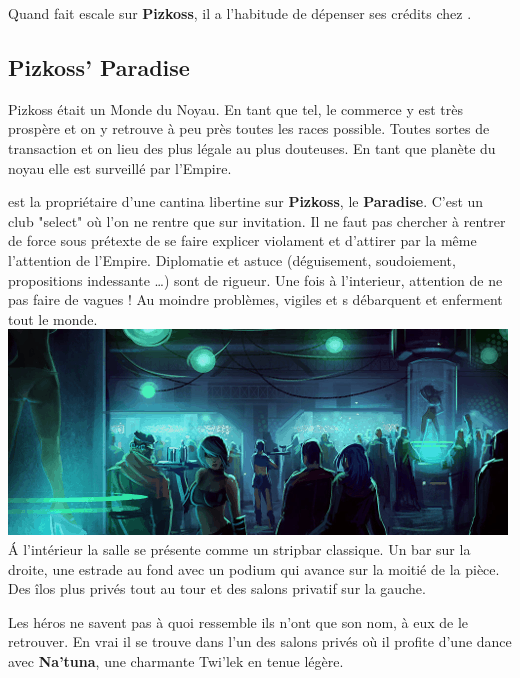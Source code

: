 Quand  fait escale sur \textbf{Pizkoss}, il a l’habitude de dépenser ses crédits chez .

\newpage
\subsection{Pizkoss’ Paradise}
Pizkoss était un Monde du Noyau. En tant que tel, le commerce y est très prospère et on y retrouve à peu près toutes les races possible. Toutes sortes de transaction et on lieu des plus légale au plus douteuses. En tant que planète du noyau elle est surveillé par l’Empire.

 est la propriétaire d’une cantina libertine sur \textbf{Pizkoss}, le \textbf{Paradise}. C’est un club "select" où l’on ne rentre que sur invitation. Il ne faut pas chercher à rentrer de force sous prétexte de se faire explicer violament et d’attirer par la même l’attention de l’Empire. Diplomatie et astuce (déguisement, soudoiement, propositions indessante \ldots) sont de rigueur. Une fois à l’interieur, attention de ne pas faire de vagues ! Au moindre problèmes, vigiles et s débarquent et enferment tout le monde.\\

\noindent\includegraphics[width=\linewidth]{_img/places/paradise-club.png}\\

\'A l’intérieur la salle se présente comme un stripbar classique. Un bar sur la droite, une estrade au fond avec un podium qui avance sur la moitié de la pièce. Des îlos plus privés tout au tour et des salons privatif sur la gauche. 

Les héros ne savent pas à quoi ressemble  ils n’ont que son nom, à eux de le retrouver. En vrai il se trouve dans l’un des salons privés où il profite d’une dance avec \textbf{Na’tuna}, une charmante Twi’lek en tenue légère.

